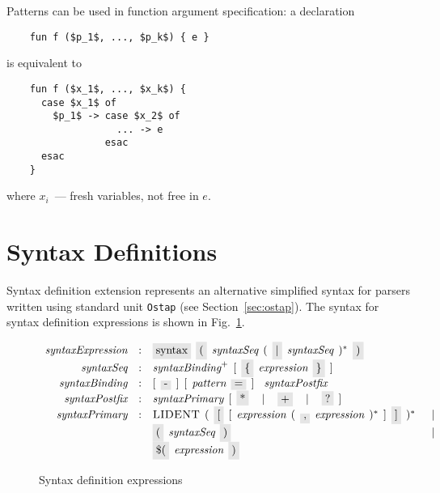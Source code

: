Patterns can be used in function argument specification: a declaration

\begin{lstlisting}
    fun f ($p_1$, ..., $p_k$) { e }
\end{lstlisting}

is equivalent to

\begin{lstlisting}
    fun f ($x_1$, ..., $x_k$) {
      case $x_1$ of
        $p_1$ -> case $x_2$ of
                   ... -> e
                 esac
      esac
    }
\end{lstlisting}

where $x_i$~--- fresh variables, not free in $e$.

\section{Syntax Definitions}

Syntax definition extension represents an alternative simplified syntax for parsers written using standard unit \lstinline|Ostap| (see Section~\ref{sec:ostap}).
The syntax for syntax definition expressions is shown in Fig.~\ref{syntax_expressions}.

\begin{figure}[h]
  \[
    \begin{array}{rcll}
      \defterm{syntaxExpression}  & : & \term{syntax}\s\term{(}\s\nonterm{syntaxSeq}\s(\s\term{$\mid$}\s\nonterm{syntaxSeq}\s)^*\s\term{)}&\\
      \defterm{syntaxSeq}         & : & \nonterm{syntaxBinding}^+\s[\s\term{\{}\s\nonterm{expression}\s\term{\}}\s]&\\
      \defterm{syntaxBinding}     & : & [\s\term{-}\s]\s[\s\nonterm{pattern}\s\term{=}\s]\s\s\nonterm{syntaxPostfix}&\\
      \defterm{syntaxPostfix}     & : & \nonterm{syntaxPrimary}\s[\s\term{*}\s\alt\s\term{+}\s\alt\s\term{?}\s]&\\
      \defterm{syntaxPrimary}     & : & \token{LIDENT}\s(\s\term{[}\s[\s\nonterm{expression}\s(\s\term{,}\s\nonterm{expression}\s)^*\s]\s\term{]}\s)^*&\alt\\
                                  &   & \term{(}\s\nonterm{syntaxSeq}\s\term{)}&\alt\\
                                  &   & \term{\$(}\s\nonterm{expression}\s\term{)}&
    \end{array}
  \]
  \caption{Syntax definition expressions}
  \label{syntax_expressions}
\end{figure}

